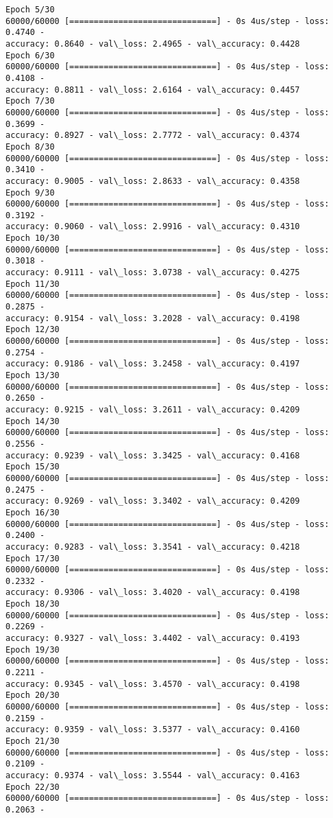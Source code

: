 \documentclass[11pt]{article}
\begin{document}
\begin{Verbatim}[commandchars=\\\{\}]
Epoch 5/30
60000/60000 [==============================] - 0s 4us/step - loss: 0.4740 -
accuracy: 0.8640 - val\_loss: 2.4965 - val\_accuracy: 0.4428
Epoch 6/30
60000/60000 [==============================] - 0s 4us/step - loss: 0.4108 -
accuracy: 0.8811 - val\_loss: 2.6164 - val\_accuracy: 0.4457
Epoch 7/30
60000/60000 [==============================] - 0s 4us/step - loss: 0.3699 -
accuracy: 0.8927 - val\_loss: 2.7772 - val\_accuracy: 0.4374
Epoch 8/30
60000/60000 [==============================] - 0s 4us/step - loss: 0.3410 -
accuracy: 0.9005 - val\_loss: 2.8633 - val\_accuracy: 0.4358
Epoch 9/30
60000/60000 [==============================] - 0s 4us/step - loss: 0.3192 -
accuracy: 0.9060 - val\_loss: 2.9916 - val\_accuracy: 0.4310
Epoch 10/30
60000/60000 [==============================] - 0s 4us/step - loss: 0.3018 -
accuracy: 0.9111 - val\_loss: 3.0738 - val\_accuracy: 0.4275
Epoch 11/30
60000/60000 [==============================] - 0s 4us/step - loss: 0.2875 -
accuracy: 0.9154 - val\_loss: 3.2028 - val\_accuracy: 0.4198
Epoch 12/30
60000/60000 [==============================] - 0s 4us/step - loss: 0.2754 -
accuracy: 0.9186 - val\_loss: 3.2458 - val\_accuracy: 0.4197
Epoch 13/30
60000/60000 [==============================] - 0s 4us/step - loss: 0.2650 -
accuracy: 0.9215 - val\_loss: 3.2611 - val\_accuracy: 0.4209
Epoch 14/30
60000/60000 [==============================] - 0s 4us/step - loss: 0.2556 -
accuracy: 0.9239 - val\_loss: 3.3425 - val\_accuracy: 0.4168
Epoch 15/30
60000/60000 [==============================] - 0s 4us/step - loss: 0.2475 -
accuracy: 0.9269 - val\_loss: 3.3402 - val\_accuracy: 0.4209
Epoch 16/30
60000/60000 [==============================] - 0s 4us/step - loss: 0.2400 -
accuracy: 0.9283 - val\_loss: 3.3541 - val\_accuracy: 0.4218
Epoch 17/30
60000/60000 [==============================] - 0s 4us/step - loss: 0.2332 -
accuracy: 0.9306 - val\_loss: 3.4020 - val\_accuracy: 0.4198
Epoch 18/30
60000/60000 [==============================] - 0s 4us/step - loss: 0.2269 -
accuracy: 0.9327 - val\_loss: 3.4402 - val\_accuracy: 0.4193
Epoch 19/30
60000/60000 [==============================] - 0s 4us/step - loss: 0.2211 -
accuracy: 0.9345 - val\_loss: 3.4570 - val\_accuracy: 0.4198
Epoch 20/30
60000/60000 [==============================] - 0s 4us/step - loss: 0.2159 -
accuracy: 0.9359 - val\_loss: 3.5377 - val\_accuracy: 0.4160
Epoch 21/30
60000/60000 [==============================] - 0s 4us/step - loss: 0.2109 -
accuracy: 0.9374 - val\_loss: 3.5544 - val\_accuracy: 0.4163
Epoch 22/30
60000/60000 [==============================] - 0s 4us/step - loss: 0.2063 -

\end{Verbatim}
\end{document}
